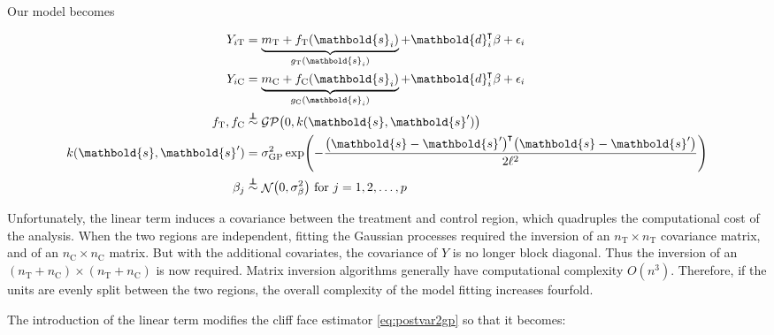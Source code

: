 \documentclass[letter]{article}
\DeclarePairedDelimiter{\parenthesis}{\lparen}{\rparen}
\newcommand{\del}[1]{\parenthesis*{#1}}
\DeclareMathOperator{\normal}{\mathcal{N}}
\newcommand{\gp}{\mathcal{GP}}
\newcommand*{\trans}{^{\mkern-1.5mu\intercal}}
\newcommand{\treat}{\mathrm{T}}
\newcommand{\ctrol}{\mathrm{C}}
\newcommand{\sigmaf}{\sigma_{\mathrm{GP}}}
\newcommand{\sigmabeta}{\sigma_{\beta}}
\newcommand{\svec}{\mathbold{s}}
\newcommand{\dvec}{\mathbold{d}}
\newcommand{\indep}{\protect\mathpalette{\protect\independenT}{\perp}}
\def\independenT#1#2{\mathrel{\rlap{$#1#2$}\mkern2mu{#1#2}}}
\begin{document}
Our model becomes

\begin{equation}
\begin{split}
Y_{i\treat} &= \underbrace{m_\treat{} + f_\treat{}(\svec_i)}_{g_\treat{}(\svec_i)} + \dvec_i\trans \beta + \epsilon_i \\
Y_{i\ctrol} &= \underbrace{m_\ctrol{} + f_\ctrol{}(\svec_i)}_{g_\ctrol{}(\svec_i)} + \dvec_i\trans \beta + \epsilon_i \\
f_\treat{}, f_\ctrol{} &\overset{\indep}{\sim} \gp\del{0, k(\svec, \svec')} \\
k(\svec,\svec') &= \sigmaf^2 \exp\del{ - \frac{\del{\svec-\svec'}\trans\del{\svec-\svec'}}{2 \ell^2}} \\
\beta_j &\overset{\indep}{\sim} \normal\del{0,\sigmabeta^2}\text{ for }j=1,2,\dotsc,p
\end{split}
\end{equation}

Unfortunately, the linear term induces a covariance between the treatment and control region, which quadruples the computational cost of the analysis.
When the two regions are independent, fitting the Gaussian processes required the inversion of an \(n_\treat{} \times n_\treat{}\) covariance matrix, and of an \(n_\ctrol{} \times n_\ctrol{}\) matrix.
But with the additional covariates, the covariance of \(Y\) is no longer block diagonal.
Thus the inversion of an \((n_\treat{}+n_\ctrol{}) \times (n_\treat{}+n_\ctrol{})\) is now required.
Matrix inversion algorithms generally have computational complexity \(O(n^3)\).
Therefore, if the units are evenly split between the two regions,
the overall complexity of the model fitting increases fourfold.
    


    	The introduction of the linear term modifies the cliff face estimator \eqref{eq:postvar2gp} so that it becomes:
\end{document}
